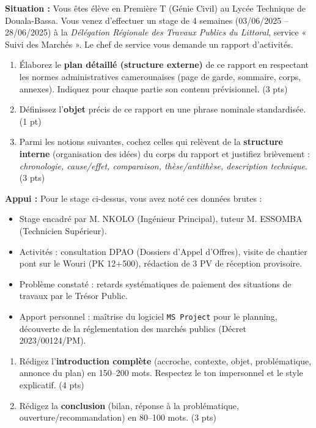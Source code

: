 \documentclass[11pt]{article}
\begin{document}
\begin{exercice}
    \textbf{Situation :} Vous êtes élève en Première T (Génie Civil) au Lycée Technique de Douala-Bassa. Vous venez d'effectuer un stage de 4 semaines (03/06/2025 -- 28/06/2025) à la \textit{Délégation Régionale des Travaux Publics du Littoral}, service « Suivi des Marchés ». Le chef de service vous demande un rapport d'activités.
    
    \begin{enumerate}
        \item Élaborez le \textbf{plan détaillé (structure externe)} de ce rapport en respectant les normes administratives camerounaises (page de garde, sommaire, corps, annexes). Indiquez pour chaque partie son contenu prévisionnel. (3 pts)
        \item Définissez l'\textbf{objet} précis de ce rapport en une phrase nominale standardisée. (1 pt)
        \item Parmi les notions suivantes, cochez celles qui relèvent de la \textbf{structure interne} (organisation des idées) du corps du rapport et justifiez brièvement : \textit{chronologie, cause/effet, comparaison, thèse/antithèse, description technique}. (3 pts)
    \end{enumerate}
\end{exercice}

\begin{exercice}
    \textbf{Appui :} Pour le stage ci-dessus, vous avez noté ces données brutes :
    \begin{itemize}
        \item Stage encadré par M. NKOLO (Ingénieur Principal), tuteur M. ESSOMBA (Technicien Supérieur).
        \item Activités : consultation DPAO (Dossiers d'Appel d'Offres), visite de chantier pont sur le Wouri (PK 12+500), rédaction de 3 PV de réception provisoire.
        \item Problème constaté : retards systématiques de paiement des situations de travaux par le Trésor Public.
        \item Apport personnel : maîtrise du logiciel \texttt{MS Project} pour le planning, découverte de la réglementation des marchés publics (Décret 2023/00124/PM).
    \end{itemize}
    
    \begin{enumerate}
        \item Rédigez l'\textbf{introduction complète} (accroche, contexte, objet, problématique, annonce du plan) en 150--200 mots. Respectez le ton impersonnel et le style explicatif. (4 pts)
        \item Rédigez la \textbf{conclusion} (bilan, réponse à la problématique, ouverture/recommandation) en 80--100 mots. (3 pts)
    \end{enumerate}
\end{exercice}
\end{document}
